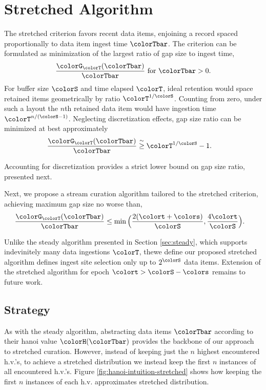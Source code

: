 \section{Stretched Algorithm} \label{sec:stretched}

The stretched criterion favors recent data items, enjoining a record spaced proportionally to data item ingest time $\colorTbar$.
The criterion can be formulated as minimization of the largest ratio of gap size to ingest time,
\begin{align*}
\frac{\colorG_{\colorT}(\colorTbar)}{\colorTbar} \text{ for } \colorTbar > 0.
\end{align*}
For buffer size $\colorS$ and time elapsed $\colorT$, ideal retention would space retained items geometrically by ratio $\colorT^{1/\colorS}$.
Counting from zero, under such a layout the $n$th retained data item would have ingestion time $\colorT^{n/(\colorS - 1)}$.
Neglecting discretization effects, gap size ratio can be minimized at best approximately
\begin{align*}
\frac{\colorG_{\colorT}(\colorTbar)}{\colorTbar}
&\stackrel{\sim}{\geq}
\colorT^{1/\colorS} - 1.
\end{align*}

Accounting for discretization provides a strict lower bound on gap size ratio, presented next.



Next, we propose a stream curation algorithm tailored to the stretched criterion, achieving maximum gap size no worse than,
\begin{align*}
\frac{\colorG_{\colorT}(\colorTbar)}{\colorTbar}
&\leq
\min\Big(
  \frac{2(\colort + \colors)}{\colorS},
  \frac{4\colort}{\colorS}
\Big).
\end{align*}

Unlike the steady algorithm presented in Section \ref{sec:steady}, which supports indevinitely many data ingestions $\colorT$, thewe define our proposed stretched algorithm defines ingest site selection only up to $2^{\colorS}$ data items.
Extension of the stretched algorithm for epoch $\colort > \colorS - \colors$ remains to future work.

\subsection{Strategy}



As with the steady algorithm, abstracting data items $\colorTbar$ according to their hanoi value $\colorH(\colorTbar)$ provides the backbone of our approach to stretched curation.
However, instead of keeping just the $n$ highest encountered h.v.'s, to achieve a stretched distribution we instead keep the first $n$ instances of all encountered h.v.'s.
Figure \ref{fig:hanoi-intuition-stretched} shows how keeping the first $n$ instances of each h.v. approximates stretched distribution.

